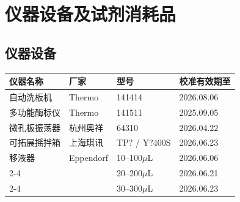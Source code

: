 \documentclass[UTF8,10pt,a4paper,fontset=fandol]{ctexart}
\newcommand{\fieldvalue}[1]{#1}
\newcommand{\handwritten}[1]{#1}
\begin{document}
\section{仪器设备及试剂消耗品}

\subsection{仪器设备}

\begin{tabularx}{\textwidth}{|l|l|l|X|}
\hline
仪器名称 & 厂家 & 型号 & 校准有效期至 \\
\hline
自动洗板机 & Thermo &
\fieldvalue{\handwritten{141414}} &
\fieldvalue{\handwritten{2026.08.06}}
\\ \hline
多功能酶标仪 & Thermo &
\fieldvalue{\handwritten{141511}} &
\fieldvalue{\handwritten{2025.09.05}}
\\ \hline
微孔板振荡器 & 杭州奥祥 &
\fieldvalue{\handwritten{64310}} &
\fieldvalue{\handwritten{2026.04.22}}
\\ \hline
可拓展摇拌箱 & 上海琪讯 &
\fieldvalue{\handwritten{TP? / Y?400S}} &
\fieldvalue{\handwritten{2026.06.23}}
\\ \hline
移液器 & Eppendorf &
\fieldvalue{\handwritten{10--100$\mu$L}} &
\fieldvalue{\handwritten{2026.06.06}}
\\ \cline{2-4}
 & &
\fieldvalue{\handwritten{20--200$\mu$L}} &
\fieldvalue{\handwritten{2026.06.21}}
\\ \cline{2-4}
 & &
\fieldvalue{\handwritten{30--300$\mu$L}} &
\fieldvalue{\handwritten{2026.06.23}}
\\ \hline
\end{tabularx}
\end{document}
